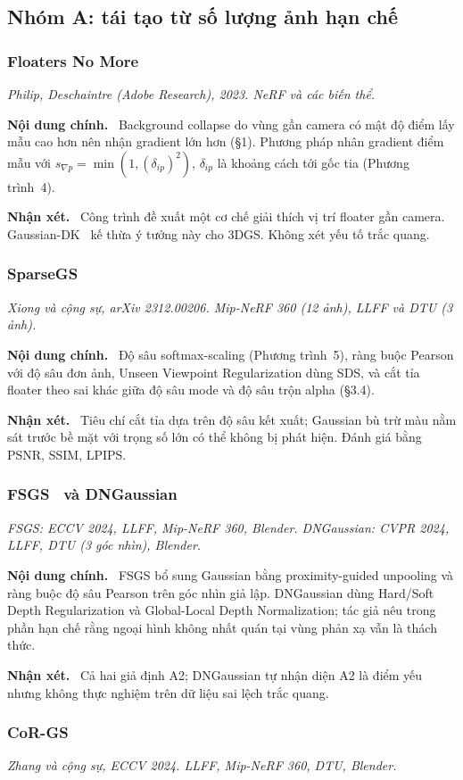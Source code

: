 \documentclass[11pt,a4paper]{article}
\newcommand{\papersays}{\par\smallskip\noindent\textbf{\color{paper}Nội dung chính.}~}
\newcommand{\wesay}{\par\smallskip\noindent\textbf{\color{nhom}Nhận xét.}~}
\newcommand{\info}[1]{\par\noindent\textit{#1}\par\smallskip}
\begin{document}
\subsection{Nhóm A: tái tạo từ số lượng ảnh hạn chế}

\subsubsection{Floaters No More~\cite{fnm}}
\info{Philip, Deschaintre (Adobe Research), 2023. NeRF và các biến thể.}
\papersays
Background collapse do vùng gần camera có mật độ điểm lấy mẫu cao hơn nên nhận gradient lớn hơn (§1). Phương pháp nhân gradient điểm mẫu với $s_{\nabla p}=\min(1,(\delta_{ip})^2)$, $\delta_{ip}$ là khoảng cách tới gốc tia (Phương trình~4).
\wesay
Công trình đề xuất một cơ chế giải thích vị trí floater gần camera. Gaussian-DK~\cite{gaussiandk} kế thừa ý tưởng này cho 3DGS. Không xét yếu tố trắc quang.

\subsubsection{SparseGS~\cite{sparsegs}}
\info{Xiong và cộng sự, arXiv 2312.00206. Mip-NeRF 360 (12 ảnh), LLFF và DTU (3 ảnh).}
\papersays
Độ sâu softmax-scaling (Phương trình~5), ràng buộc Pearson với độ sâu đơn ảnh, Unseen Viewpoint Regularization dùng SDS, và cắt tỉa floater theo sai khác giữa độ sâu mode và độ sâu trộn alpha (§3.4).
\wesay
Tiêu chí cắt tỉa dựa trên độ sâu kết xuất; Gaussian bù trừ màu nằm sát trước bề mặt với trọng số lớn có thể không bị phát hiện. Đánh giá bằng PSNR, SSIM, LPIPS.

\subsubsection{FSGS~\cite{fsgs} và DNGaussian~\cite{dngaussian}}
\info{FSGS: ECCV 2024, LLFF, Mip-NeRF 360, Blender. DNGaussian: CVPR 2024, LLFF, DTU (3 góc nhìn), Blender.}
\papersays
FSGS bổ sung Gaussian bằng proximity-guided unpooling và ràng buộc độ sâu Pearson trên góc nhìn giả lập. DNGaussian dùng Hard/Soft Depth Regularization và Global-Local Depth Normalization; tác giả nêu trong phần hạn chế rằng ngoại hình không nhất quán tại vùng phản xạ vẫn là thách thức.
\wesay
Cả hai giả định A2; DNGaussian tự nhận diện A2 là điểm yếu nhưng không thực nghiệm trên dữ liệu sai lệch trắc quang.

\subsubsection{CoR-GS~\cite{corgs}}
\info{Zhang và cộng sự, ECCV 2024. LLFF, Mip-NeRF 360, DTU, Blender.}
\end{document}
